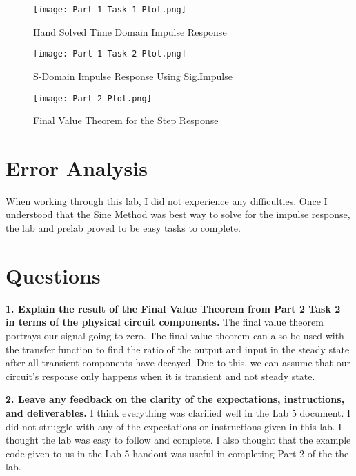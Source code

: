 \documentclass[12pt]{report}
\begin{document}
\begin{figure}
\texttt{[image: Part 1 Task 1 Plot.png]}
\caption{Hand Solved Time Domain Impulse Response}
\end{figure}

\begin{figure}
\texttt{[image: Part 1 Task 2 Plot.png]}
\caption{S-Domain Impulse Response Using Sig.Impulse }
\end{figure}

\begin{figure}
\texttt{[image: Part 2 Plot.png]}
\caption{Final Value Theorem for the Step Response}
\end{figure}



\newpage

\section{Error Analysis}

When working through this lab, I did not experience any difficulties. Once I understood that the Sine Method was best way to solve for the impulse response, the lab and prelab proved to be easy tasks to complete. 



\section{Questions}

\textbf{1. Explain the result of the Final Value Theorem from Part 2 Task 2 in terms of the physical circuit components.}
The final value theorem portrays our signal going to zero. The final value theorem can also be used with the transfer function to find the ratio of the output and input in the steady state after all transient components have decayed. Due to this, we can assume that our circuit's response only happens when it is transient and not steady state. 

\textbf{2. Leave any feedback on the clarity of the expectations, instructions, and deliverables.}
{I think everything was clarified well in the Lab 5 document. I did not struggle with any of the expectations or instructions given in this lab. I thought the lab was easy to follow and complete. I also thought that the example code given to us in the Lab 5 handout was useful in completing Part 2 of the the lab.  }
\end{document}
